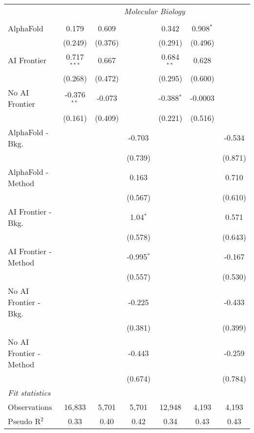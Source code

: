 \begin{tabular}{lcccccc}
 & \multicolumn{6}{c}{\textit{Molecular Biology}} \\ \\
   AlphaFold               & 0.179         & 0.609   &              & 0.342        & 0.908$^{*}$ &   \\   
                           & (0.249)       & (0.376) &              & (0.291)      & (0.496)     &   \\   
   AI Frontier             & 0.717$^{***}$ & 0.667   &              & 0.684$^{**}$ & 0.628       &   \\   
                           & (0.268)       & (0.472) &              & (0.295)      & (0.600)     &   \\   
   No AI Frontier          & -0.376$^{**}$ & -0.073  &              & -0.388$^{*}$ & -0.0003     &   \\   
                           & (0.161)       & (0.409) &              & (0.221)      & (0.516)     &   \\   
   AlphaFold - Bkg.        &               &         & -0.703       &              &             & -0.534\\   
                           &               &         & (0.739)      &              &             & (0.871)\\   
   AlphaFold - Method      &               &         & 0.163        &              &             & 0.710\\   
                           &               &         & (0.567)      &              &             & (0.610)\\   
   AI Frontier - Bkg.      &               &         & 1.04$^{*}$   &              &             & 0.571\\   
                           &               &         & (0.578)      &              &             & (0.643)\\   
   AI Frontier - Method    &               &         & -0.995$^{*}$ &              &             & -0.167\\   
                           &               &         & (0.557)      &              &             & (0.530)\\   
   No AI Frontier - Bkg.   &               &         & -0.225       &              &             & -0.433\\   
                           &               &         & (0.381)      &              &             & (0.399)\\   
   No AI Frontier - Method &               &         & -0.443       &              &             & -0.259\\   
                           &               &         & (0.674)      &              &             & (0.784)\\   
   \midrule
   \emph{Fit statistics}\\
   Observations            & 16,833        & 5,701   & 5,701        & 12,948       & 4,193       & 4,193\\  
   Pseudo R$^2$            & 0.33          & 0.40    & 0.42         & 0.34         & 0.43        & 0.43\\  
   

\end{tabular}
